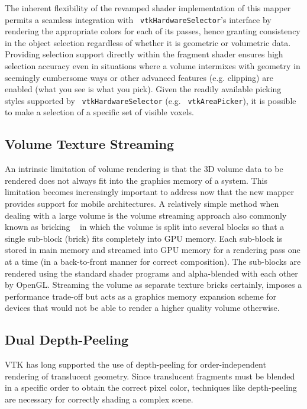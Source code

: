 The inherent flexibility of the revamped shader implementation of this mapper
permits a seamless integration with ~\texttt{vtkHardwareSelector}'s interface by
rendering the appropriate colors for each of its passes, hence granting
consistency in the object selection regardless of whether it is geometric or
volumetric data.  Providing selection support directly within the fragment
shader ensures high selection accuracy even in situations where a volume
intermixes with geometry in seemingly cumbersome ways or other advanced features
(e.g. clipping) are enabled (what you see is what you pick).  Given the readily
available picking styles supported by ~\texttt{vtkHardwareSelector} (e.g.
~\texttt{vtkAreaPicker}), it is possible to make a selection of a specific set
of visible voxels.

\subsection{Volume Texture Streaming} An intrinsic limitation of volume
rendering is that the 3D volume data to be rendered does not always fit into the
graphics memory of a system. This limitation becomes increasingly important to
address now that the new mapper provides support for mobile architectures.  A
relatively simple method when dealing with a large volume is the volume
streaming approach also commonly known as bricking ~\citep{engel_real-time_2006}
in which the volume is split into several blocks so that a single sub-block (brick)
fits completely into GPU memory.  Each sub-block is stored in main memory and streamed
into GPU memory for a rendering pass one at a time (in a back-to-front manner for correct
composition). The sub-blocks are rendered using the standard shader programs and
alpha-blended with each other by OpenGL. Streaming the volume as separate
texture bricks certainly, imposes a performance trade-off but acts as a graphics
memory expansion scheme for devices that would not be able to render a higher
quality volume otherwise.

\subsection{Dual Depth-Peeling} VTK has long supported the use of depth-peeling
for order-independent rendering of translucent geometry. Since translucent
fragments must be blended in a specific order to obtain the correct pixel color,
techniques like depth-peeling are necessary for correctly shading a complex
scene.

